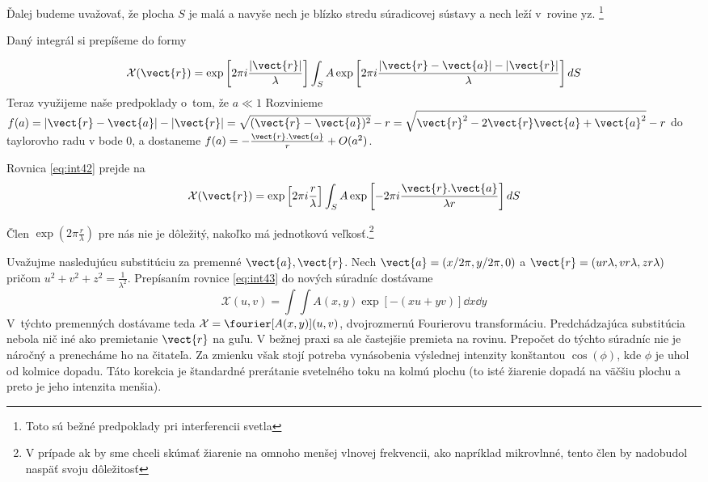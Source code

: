 Ďalej budeme uvažovať, že plocha $S$ je malá a navyše nech je
blízko stredu súradicovej sústavy a nech leží v~rovine yz.
\footnote{Toto sú bežné predpoklady pri interferencii svetla}

Daný integrál si prepíšeme do formy

\begin{equation}
\mathcal{X}(\vect{r})=
 \exp \left[ 2 \pi i \frac{|\vect{r}|}{\lambda} \right]
\int_S A
 \exp \left[ 2 \pi i \frac{|\vect{r}-\vect{a}|-|\vect{r}|}{\lambda}
 \right] dS
 \label{eq:int42} 
\end{equation}
Teraz využijeme naše predpoklady o~tom, že $a \ll 1$
Rozvinieme 
$\displaystyle f(a)=|\vect{r}-\vect{a}|-|\vect{r}| =
\sqrt{ (\vect{r}-\vect{a})^2 } - r =
\sqrt{ \vect{r}^2 - 2 \vect{r}\vect{a} + \vect{a}^2 } -r$
do taylorovho radu v bode 0, a dostaneme
$f(a)=-\frac{\vect{r}.\vect{a}}{r} +O(a^2)$.

Rovnica \ref{eq:int42} prejde na
\begin{equation}
\mathcal{X}(\vect{r})=
 \exp \left[ 2 \pi i \frac{r}{\lambda} \right]
\int_S A
 \exp \left[- 2 \pi i \frac{\vect{r}.\vect{a}}{\lambda r} \right] dS
 \label{eq:int43}
\end{equation}

Člen $\exp \left(2 \pi \frac{r}{\lambda} \right)$ pre nás nie je
dôležitý, nakoľko má jednotkovú veľkosť.\footnote{V prípade ak by sme
chceli skúmať žiarenie na omnoho menšej vlnovej frekvencii, ako
napríklad mikrovlnné, tento člen by nadobudol naspäť svoju dôležitosť}

Uvažujme nasledujúcu substitúciu za premenné $\vect{a}, \vect{r}$.
Nech $\vect{a}=(x/2 \pi,y/2 \pi,0)$ a 
$\vect{r}=(u r \lambda, v r \lambda,z r \lambda)$ pričom
$u^2 + v^2 + z^2=\frac{1}{\lambda^2}$.
Prepísaním rovnice \ref{eq:int43} do nových súradníc dostávame
\begin{equation}
\mathcal{X}(u,v)=
\int \int A(x,y)
 \exp \left[-(xu+yv) \right] \dd x \dd y
\end{equation}
V~týchto premenných dostávame teda
$\mathcal{X}=\fourier[A(x,y)](u,v)$, dvojrozmernú Fourierovu transformáciu.
Predchádzajúca substitúcia nebola nič iné ako premietanie $\vect{r}$
na guľu. V bežnej praxi sa ale častejšie premieta na rovinu. Prepočet
do týchto súradníc nie je náročný a prenecháme ho na čitateľa. Za
zmienku však stojí potreba vynásobenia výslednej intenzity
konštantou $\cos(\phi)$, kde $\phi$ je uhol od kolmice dopadu. Táto
korekcia je štandardné prerátanie svetelného toku na kolmú plochu (to
isté žiarenie dopadá na väčšiu plochu a preto je jeho intenzita
menšia).


